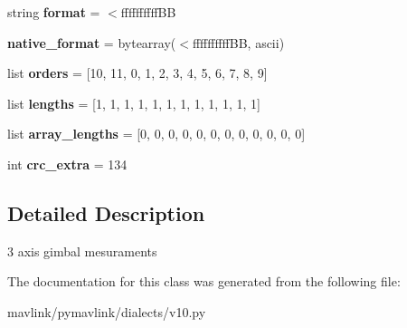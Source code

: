 \begin{DoxyCompactItemize}
\item 
\mbox{\label{classpymavlink_1_1dialects_1_1v10_1_1MAVLink__gimbal__report__message_a66e649faf576fb2e0f76b4608db51f4b}} 
string {\bfseries format} = \textquotesingle{}$<$ffffffffff\+BB\textquotesingle{}
\item 
\mbox{\label{classpymavlink_1_1dialects_1_1v10_1_1MAVLink__gimbal__report__message_ac6cc3cf1748ce781553fafce74ba6b87}} 
{\bfseries native\+\_\+format} = bytearray(\textquotesingle{}$<$ffffffffff\+BB\textquotesingle{}, \textquotesingle{}ascii\textquotesingle{})
\item 
\mbox{\label{classpymavlink_1_1dialects_1_1v10_1_1MAVLink__gimbal__report__message_aba22dd17ffbeca4aa2698825129840b9}} 
list {\bfseries orders} = \mbox{[}10, 11, 0, 1, 2, 3, 4, 5, 6, 7, 8, 9\mbox{]}
\item 
\mbox{\label{classpymavlink_1_1dialects_1_1v10_1_1MAVLink__gimbal__report__message_a994a5e1424c95fda52e4bffc762a6ae5}} 
list {\bfseries lengths} = \mbox{[}1, 1, 1, 1, 1, 1, 1, 1, 1, 1, 1, 1\mbox{]}
\item 
\mbox{\label{classpymavlink_1_1dialects_1_1v10_1_1MAVLink__gimbal__report__message_a5fcdad5a853d36c614d9419c0f045622}} 
list {\bfseries array\+\_\+lengths} = \mbox{[}0, 0, 0, 0, 0, 0, 0, 0, 0, 0, 0, 0\mbox{]}
\item 
\mbox{\label{classpymavlink_1_1dialects_1_1v10_1_1MAVLink__gimbal__report__message_a697a15234964a6a724606431a395f046}} 
int {\bfseries crc\+\_\+extra} = 134
\end{DoxyCompactItemize}


\subsection{Detailed Description}
\begin{DoxyVerb}3 axis gimbal mesuraments
\end{DoxyVerb}
 

The documentation for this class was generated from the following file\+:\begin{DoxyCompactItemize}
\item 
mavlink/pymavlink/dialects/v10.\+py\end{DoxyCompactItemize}
